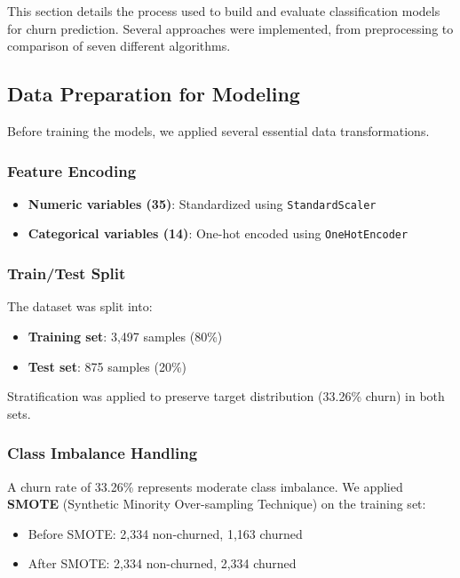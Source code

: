 \documentclass[12pt,a4paper]{article}
\begin{document}
This section details the process used to build and evaluate classification models for churn prediction. Several approaches were implemented, from preprocessing to comparison of seven different algorithms.

\subsection{Data Preparation for Modeling}

Before training the models, we applied several essential data transformations.

\subsubsection{Feature Encoding}
\begin{itemize}
    \item \textbf{Numeric variables (35)}: Standardized using \texttt{StandardScaler}
    \item \textbf{Categorical variables (14)}: One-hot encoded using \texttt{OneHotEncoder}
\end{itemize}

\subsubsection{Train/Test Split}
The dataset was split into:
\begin{itemize}
    \item \textbf{Training set}: 3,497 samples (80\%)
    \item \textbf{Test set}: 875 samples (20\%)
\end{itemize}

Stratification was applied to preserve target distribution (33.26\% churn) in both sets.

\subsubsection{Class Imbalance Handling}

A churn rate of 33.26\% represents moderate class imbalance. We applied \textbf{SMOTE} (Synthetic Minority Over-sampling Technique) on the training set:
\begin{itemize}
    \item Before SMOTE: 2,334 non-churned, 1,163 churned
    \item After SMOTE: 2,334 non-churned, 2,334 churned
\end{itemize}
\end{document}
